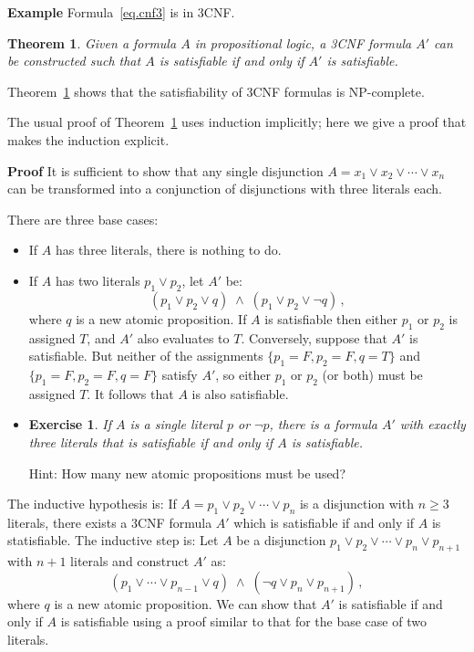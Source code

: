 \documentclass[11pt,a4paper]{report}
\newtheorem{theorem}{Theorem}
\newtheorem{exercise}{Exercise}
\begin{document}
\vspace*{-10pt}

\textbf{Example} Formula~\ref{eq.cnf3} is in 3CNF.

\begin{theorem}\label{t.cnf3}
Given a formula $A$ in propositional logic, a 3CNF formula $A'$ can be constructed such that $A$ is satisfiable if and only if $A'$ is satisfiable.
\end{theorem}

\vspace*{-10pt}

Theorem~\ref{t.cnf3} shows that the satisfiability of 3CNF formulas is NP-complete.

The usual proof of Theorem~\ref{t.cnf3} uses induction implicitly; here we give a proof that makes the induction explicit.

\textbf{Proof} It is sufficient to show that any single disjunction $A=x_1 \vee x_2 \vee \cdots \vee x_n$ can be transformed into a conjunction of disjunctions with three literals each.

There are three base cases:
\begin{itemize}
\item If $A$ has three literals, there is nothing to do.

\item If $A$ has two literals $p_1\vee p_2$, let $A'$ be:
\[
(p_1 \vee p_2 \vee q) \;\wedge\; (p_1 \vee p_2 \vee \neg q)\,,
\]
where $q$ is a new atomic proposition. If $A$ is satisfiable then either $p_1$ or $p_2$ is assigned $T$, and $A'$ also evaluates to $T$. Conversely, suppose that $A'$ is satisfiable. But neither of the assignments $\{p_1=F,p_2=F,q=T\}$ and $\{p_1=F,p_2=F,q=F\}$ satisfy $A'$, so either $p_1$ or $p_2$ (or both) must be assigned $T$. It follows that $A$ is also satisfiable.

\item
\begin{exercise}
If $A$ is a single literal $p$ or $\neg p$, there is a formula $A'$ with exactly three literals that is satisfiable if and only if $A$ is satisfiable. 
\end{exercise}
Hint: How many new atomic propositions must be used?
\end{itemize}

The inductive hypothesis is: If $A=p_1 \vee p_2 \vee \cdots \vee p_n$ is a disjunction with $n\geq 3$ literals, there exists a 3CNF formula $A'$ which is satisfiable if and only if $A$ is statisfiable. The inductive step is: Let $A$ be a disjunction $p_1 \vee p_2 \vee \cdots \vee p_n \vee p_{n+1}$ with $n+1$ literals and construct $A'$ as:
\begin{displaymath}
(p_1 \vee \cdots \vee p_{n-1} \vee q) \;\wedge\; (\neg q \vee p_n \vee p_{n+1})\,,
\end{displaymath}
where $q$ is a new atomic proposition. We can show that $A'$ is satisfiable if and only if $A$ is satisfiable using a proof similar to that for the base case of two literals.
\end{document}
